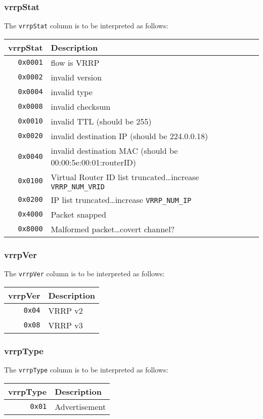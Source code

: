 \documentclass[documentation]{subfiles}
\begin{document}
\subsubsection{vrrpStat}\label{vrrpStat}
The {\tt vrrpStat} column is to be interpreted as follows:
\begin{longtable}{rl}
    \toprule
    {\bf vrrpStat} & {\bf Description}\\
    \midrule\endhead%
    {\tt 0x0001} & flow is VRRP\\
    {\tt 0x0002} & invalid version\\
    {\tt 0x0004} & invalid type\\
    {\tt 0x0008} & invalid checksum\\
    {\tt 0x0010} & invalid TTL (should be 255)\\
    {\tt 0x0020} & invalid destination IP (should be 224.0.0.18)\\
    {\tt 0x0040} & invalid destination MAC (should be 00:00:5e:00:01:routerID)\\
    {\tt 0x0100} & Virtual Router ID list truncated\ldots increase {\tt VRRP\_NUM\_VRID}\\
    {\tt 0x0200} & IP list truncated\ldots increase {\tt VRRP\_NUM\_IP}\\
    {\tt 0x4000} & Packet snapped\\
    {\tt 0x8000} & Malformed packet\ldots covert channel?\\
    \bottomrule
\end{longtable}

\subsubsection{vrrpVer}\label{vrrpVer}
The {\tt vrrpVer} column is to be interpreted as follows:
\begin{longtable}{rl}
    \toprule
    {\bf vrrpVer} & {\bf Description}\\
    \midrule\endhead%
    {\tt 0x04} & VRRP v2\\
    {\tt 0x08} & VRRP v3\\
    \bottomrule
\end{longtable}

\subsubsection{vrrpType}\label{vrrpType}
The {\tt vrrpType} column is to be interpreted as follows:
\begin{longtable}{rl}
    \toprule
    {\bf vrrpType} & {\bf Description}\\
    \midrule\endhead%
    {\tt 0x01} & Advertisement\\
    \bottomrule
\end{longtable}
\end{document}
